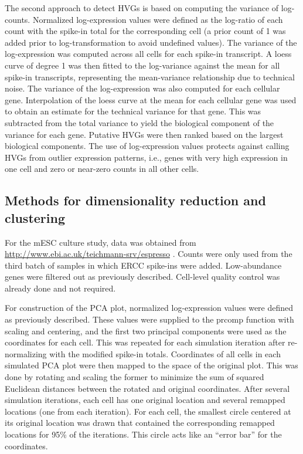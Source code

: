 \documentclass{article}
\begin{document}
The second approach to detect HVGs is based on computing the variance of log-counts.
Normalized log-expression values were defined as the log-ratio of each count with the spike-in total for the corresponding cell
    (a prior count of 1 was added prior to log-transformation to avoid undefined values).
The variance of the log-expression was computed across all cells for each spike-in transcript.
A loess curve of degree 1 was then fitted to the log-variance against the mean for all spike-in transcripts, representing the mean-variance relationship due to technical noise.
The variance of the log-expression was also computed for each cellular gene.
Interpolation of the loess curve at the mean for each cellular gene was used to obtain an estimate for the technical variance for that gene.
This was subtracted from the total variance to yield the biological component of the variance for each gene.
Putative HVGs were then ranked based on the largest biological components.
The use of log-expression values protects against calling HVGs from outlier expression patterns, i.e., genes with very high expression in one cell and zero or near-zero counts in all other cells.

\subsection{Methods for dimensionality reduction and clustering}
For the mESC culture study, data was obtained from \url{http://www.ebi.ac.uk/teichmann-srv/espresso} \cite{kolod2015single}.
Counts were only used from the third batch of samples in which ERCC spike-ins were added.
Low-abundance genes were filtered out as previously described.
Cell-level quality control was already done and not required.

For construction of the PCA plot, normalized log-expression values were defined as previously described.
These values were supplied to the prcomp function with scaling and centering, and the first two principal components were used as the coordinates for each cell.
This was repeated for each simulation iteration after re-normalizing with the modified spike-in totals.
Coordinates of all cells in each simulated PCA plot were then mapped to the space of the original plot.
This was done by rotating and scaling the former to minimize the sum of squared Euclidean distances between the rotated and original coordinates.
After several simulation iterations, each cell has one original location and several remapped locations (one from each iteration). 
For each cell, the smallest circle centered at its original location was drawn that contained the corresponding remapped locations for 95\% of the iterations.
This circle acts like an ``error bar'' for the coordinates.
\end{document}
